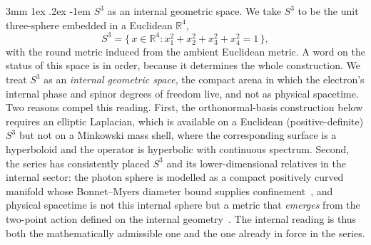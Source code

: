 \documentclass[%
 reprint, amsmath,amssymb, aps, prb, ]{revtex4-2}
\makeatletter
\numberwithin{equation}{section}
\renewcommand\paragraph{%
  \@startsection{paragraph}{4}{\z@}%
    {3mm \@plus 1ex \@minus .2ex}%
    {-1em}%
    {\normalfont\normalsize\itshape}}
\makeatother
\begin{document}
\paragraph{$S^{3}$ as an internal geometric space.}
We take $S^{3}$ to be the unit three-sphere embedded in a Euclidean $\mathbb{R}^{4}$,
\begin{equation}
\label{eq:s3def}
S^{3} = \{\, x \in \mathbb{R}^{4} : x_{1}^{2}+x_{2}^{2}+x_{3}^{2}+x_{4}^{2} = 1 \,\},
\end{equation}
with the round metric induced from the ambient Euclidean metric. A word on the status of this space is in order, because it determines the whole construction. We treat $S^{3}$ as an \emph{internal geometric space}, the compact arena in which the electron's internal phase and spinor degrees of freedom live, and not as physical spacetime. Two reasons compel this reading. First, the orthonormal-basis construction below requires an elliptic Laplacian, which is available on a Euclidean (positive-definite) $S^{3}$ but not on a Minkowski mass shell, where the corresponding surface is a hyperboloid and the operator is hyperbolic with continuous spectrum. Second, the series has consistently placed $S^{3}$ and its lower-dimensional relatives in the internal sector: the photon sphere is modelled as a compact positively curved manifold whose Bonnet--Myers diameter bound supplies confinement~\cite{hanamura51}, and physical spacetime is not this internal sphere but a metric that \emph{emerges} from the two-point action defined on the internal geometry~\cite{hanamura51,hanamura63}. The internal reading is thus both the mathematically admissible one and the one already in force in the series.
\end{document}
